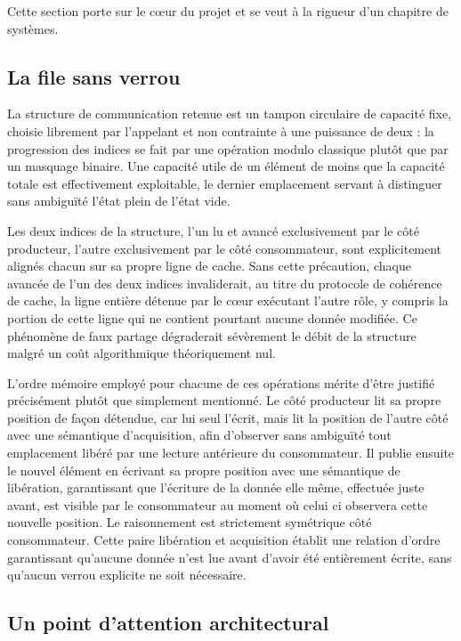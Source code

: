\documentclass[12pt,a4paper]{report}
\begin{document}
Cette section porte sur le cœur du projet et se veut à la rigueur d'un chapitre de systèmes.

\subsection{La file sans verrou}

La structure de communication retenue est un tampon circulaire de capacité fixe, choisie librement par l'appelant et non contrainte à une puissance de deux : la progression des indices se fait par une opération modulo classique plutôt que par un masquage binaire. Une capacité utile de un élément de moins que la capacité totale est effectivement exploitable, le dernier emplacement servant à distinguer sans ambiguïté l'état plein de l'état vide.

Les deux indices de la structure, l'un lu et avancé exclusivement par le côté producteur, l'autre exclusivement par le côté consommateur, sont explicitement alignés chacun sur sa propre ligne de cache. Sans cette précaution, chaque avancée de l'un des deux indices invaliderait, au titre du protocole de cohérence de cache, la ligne entière détenue par le cœur exécutant l'autre rôle, y compris la portion de cette ligne qui ne contient pourtant aucune donnée modifiée. Ce phénomène de faux partage dégraderait sévèrement le débit de la structure malgré un coût algorithmique théoriquement nul.

L'ordre mémoire employé pour chacune de ces opérations mérite d'être justifié précisément plutôt que simplement mentionné. Le côté producteur lit sa propre position de façon détendue, car lui seul l'écrit, mais lit la position de l'autre côté avec une sémantique d'acquisition, afin d'observer sans ambiguïté tout emplacement libéré par une lecture antérieure du consommateur. Il publie ensuite le nouvel élément en écrivant sa propre position avec une sémantique de libération, garantissant que l'écriture de la donnée elle même, effectuée juste avant, est visible par le consommateur au moment où celui ci observera cette nouvelle position. Le raisonnement est strictement symétrique côté consommateur. Cette paire libération et acquisition établit une relation d'ordre garantissant qu'aucune donnée n'est lue avant d'avoir été entièrement écrite, sans qu'aucun verrou explicite ne soit nécessaire.

\subsection{Un point d'attention architectural}
\end{document}
